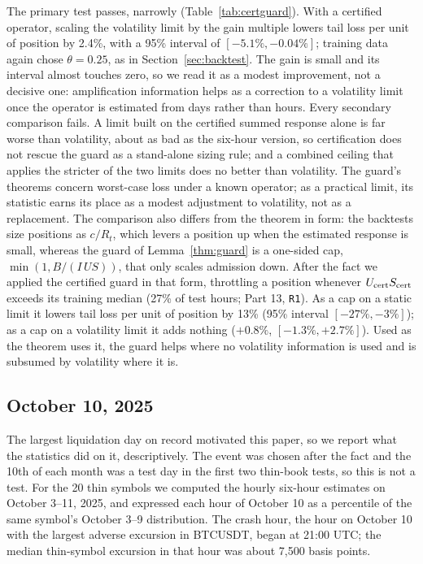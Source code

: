 The primary test passes, narrowly (Table~\ref{tab:certguard}). With a certified operator, scaling the volatility limit by the gain multiple lowers tail loss per unit of position by 2.4\%, with a 95\% interval of $[-5.1\%,-0.04\%]$; training data again chose $\theta=0.25$, as in Section~\ref{sec:backtest}. The gain is small and its interval almost touches zero, so we read it as a modest improvement, not a decisive one: amplification information helps as a correction to a volatility limit once the operator is estimated from days rather than hours. Every secondary comparison fails. A limit built on the certified summed response alone is far worse than volatility, about as bad as the six-hour version, so certification does not rescue the guard as a stand-alone sizing rule; and a combined ceiling that applies the stricter of the two limits does no better than volatility. The guard's theorems concern worst-case loss under a known operator; as a practical limit, its statistic earns its place as a modest adjustment to volatility, not as a replacement. The comparison also differs from the theorem in form: the backtests size positions as $c/R_t$, which levers a position up when the estimated response is small, whereas the guard of Lemma~\ref{thm:guard} is a one-sided cap, $\min(1,B/(I\,U S))$, that only scales admission down. After the fact we applied the certified guard in that form, throttling a position whenever $U_{\rm cert}S_{\rm cert}$ exceeds its training median (27\% of test hours; Part 13, \texttt{R1}). As a cap on a static limit it lowers tail loss per unit of position by 13\% (95\% interval $[-27\%,-3\%]$); as a cap on a volatility limit it adds nothing ($+0.8\%$, $[-1.3\%,+2.7\%]$). Used as the theorem uses it, the guard helps where no volatility information is used and is subsumed by volatility where it is.

\subsection{October 10, 2025}\label{sec:oct10}
The largest liquidation day on record motivated this paper, so we report what the statistics did on it, descriptively. The event was chosen after the fact and the 10th of each month was a test day in the first two thin-book tests, so this is not a test. For the 20 thin symbols we computed the hourly six-hour estimates on October 3--11, 2025, and expressed each hour of October 10 as a percentile of the same symbol's October 3--9 distribution. The crash hour, the hour on October 10 with the largest adverse excursion in BTCUSDT, began at 21:00 UTC; the median thin-symbol excursion in that hour was about 7{,}500 basis points.

